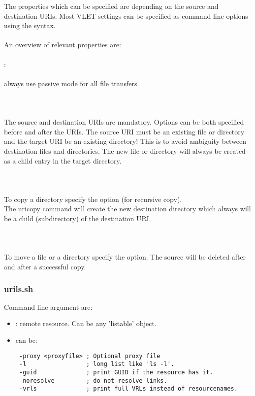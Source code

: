 The properties which can be specified are depending on the source and
destination URIs. Most VLET settings can be specified as command line options 
using the  syntax. \\
\\
An overview of relevant properties are:\\
\\
:\\
\\
\tab {} always use passive mode for all file transfers.\\
\\ 
\\
\\
The source and destination URIs are mandatory. Options can be both specified
before and after the URIs. The source URI must be an existing file or directory
and the target URI  be an existing directory! This is to
avoid ambiguity between destination files and directories. The new file or
directory will always be created as a child entry in the target directory.\\
\\
\\
\\
To copy a directory specify the  option (for recursive copy).\\
The uricopy command will create the new destination directory which
always will be a child (subdirectory) of the destination URI.\\
\\
\\
\\
To move a file or a directory specify the  option. The source will
be deleted after and  after a successful copy. 

\subsubsection{urils.sh}

\tab {} 

Command line argument are: 
\begin{itemize}
  \item {} : remote resource. Can be any 'listable' object. 
  \item \Path{ [options] } can be: 

\hspace*{10mm}\begin{minipage}{170mm}
\begin{verbatim} 
 -proxy <proxyfile> ; Optional proxy file
 -l                 ; long list like 'ls -l'.
 -guid              ; print GUID if the resource has it.
 -noresolve         ; do not resolve links.
 -vrls              ; print full VRLs instead of resourcenames.
\end{verbatim}
\end{minipage}
\end{itemize}

